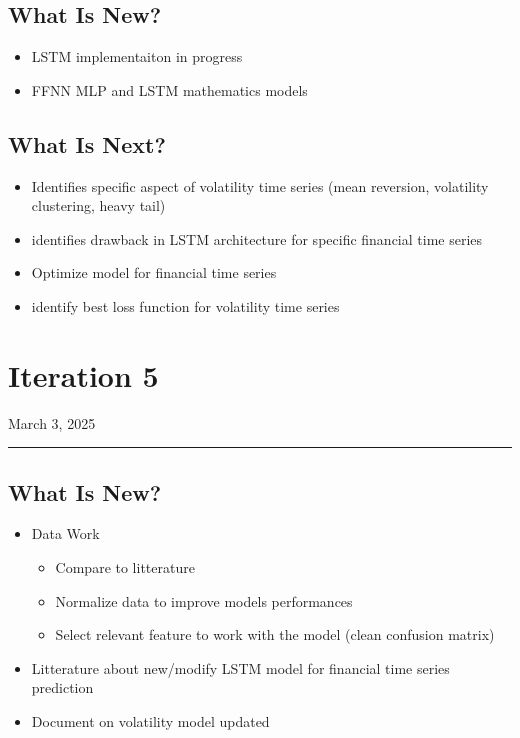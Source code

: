 \documentclass[letterpaper,11pt]{article}
\begin{document}
\subsection*{What Is New?}
\begin{itemize}
  \item LSTM implementaiton in progress
  \item FFNN MLP and LSTM mathematics models
\end{itemize}

\subsection*{What Is Next?}
\begin{itemize} 
  \item Identifies specific aspect of volatility time series (mean reversion, volatility clustering, heavy tail)
  \item identifies drawback in LSTM architecture for specific financial time series
  \item Optimize model for financial time series 
  \item identify best loss function for volatility time series
\end{itemize}





\newpage
\section*{Iteration 5}
\begin{flushright}
March 3, 2025
\end{flushright}
\hrule
\vspace{0.2in}
\subsection*{What Is New?}
\begin{itemize}
  \item Data Work\begin{itemize}
    \item Compare to litterature
    \item Normalize data to improve models performances
    \item Select relevant feature to work with the model (clean confusion matrix)
  \end{itemize}
  \item Litterature about new/modify LSTM model for financial time series prediction
  \item Document on volatility model updated
\end{itemize}
\end{document}
